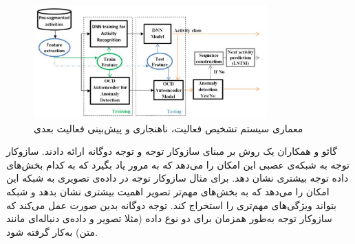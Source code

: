 \begin{figure}[htbp]
  \centering
  \includegraphics[width=0.8\textwidth]{Images/Chapter2/alaghbari-framework.png}
  \caption{معماری سیستم تشخیص فعالیت، ناهنجاری و پیش‌بینی فعالیت بعدی}
  \label{fig:alaghbari-framework}
\end{figure}

گائو و همکاران\cite{gao2021danhar}
یک روش بر مبنای سازوکار توجه
و توجه دوگانه
ارائه دادند. سازوکار توجه به شبکه‌ی عصبی این امکان را می‌دهد که به مرور یاد بگیرد که به کدام بخش‌های داده توجه بیشتری نشان دهد. برای مثال سازوکار توجه در داده‌ی تصویری به شبکه این امکان را می‌دهد که به بخش‌های مهم‌تر تصویر اهمیت بیشتری نشان بدهد و شبکه بتواند ویژگی‌های مهم‌تری را استخراج کند. توجه دوگانه بدین صورت عمل می‌کند که سازوکار توجه به‌طور همزمان برای دو نوع داده (مثلا تصویر و داده‌ی دنباله‌ای مانند متن) به‌کار گرفته شود.


